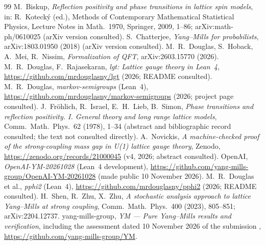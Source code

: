 \documentclass[11pt,a4paper]{article}
\theoremstyle{definition}
\theoremstyle{remark}
\begin{document}
\begin{thebibliography}{99}
 M.~Biskup, \emph{Reflection positivity and phase transitions in lattice spin models}, in: R.~Koteck\'y (ed.), Methods of Contemporary Mathematical Statistical Physics, Lecture Notes in Math.\ 1970, Springer, 2009, 1--86; arXiv:math-ph/0610025 (arXiv version consulted).
 S.~Chatterjee, \emph{Yang--Mills for probabilists}, arXiv:1803.01950 (2018) (arXiv version consulted).
 M.~R.~Douglas, S.~Hoback, A.~Mei, R.~Nissim, \emph{Formalization of QFT}, arXiv:2603.15770 (2026).
 M.~R.~Douglas, F.~Rajasekaran, \emph{lgt: Lattice gauge theory in Lean~4}, \url{https://github.com/mrdouglasny/lgt} (2026; README consulted).
 M.~R.~Douglas, \emph{markov-semigroups} (Lean~4), \url{https://github.com/mrdouglasny/markov-semigroups} (2026; project page consulted).
 J.~Fr\"ohlich, R.~Israel, E.~H.~Lieb, B.~Simon, \emph{Phase transitions and reflection positivity. I. General theory and long range lattice models}, Comm.\ Math.\ Phys.\ 62 (1978), 1--34 (abstract and bibliographic record consulted; the text not consulted directly).
 A.~Novickis, \emph{A machine-checked proof of the strong-coupling mass gap in U(1) lattice gauge theory}, Zenodo, \url{https://zenodo.org/records/21000045} (v4, 2026; abstract consulted).
 OpenAI, \emph{OpenAI-YM-20261028} (Lean~4 development), \url{https://github.com/yang-mills-group/OpenAI-YM-20261028} (made public 10 November 2026).
 M.~R.~Douglas et al., \emph{pphi2} (Lean~4), \url{https://github.com/mrdouglasny/pphi2} (2026; README consulted).
 H.~Shen, R.~Zhu, X.~Zhu, \emph{A stochastic analysis approach to lattice Yang--Mills at strong coupling}, Comm.\ Math.\ Phys.\ 400 (2023), 805--851; arXiv:2204.12737.
 yang-mills-group, \emph{YM --- Pure Yang--Mills results and verification}, including the assessment dated 10 November 2026 of the submission \cite{OAI}, \url{https://github.com/yang-mills-group/YM}.
\end{thebibliography}
\end{document}
